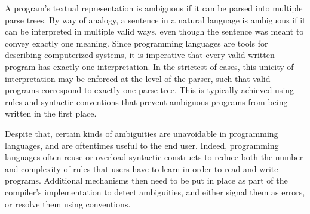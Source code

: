 
A program's textual representation is ambiguous if it can be parsed into multiple parse trees.
By way of analogy, a sentence in a natural language is ambiguous if it can be interpreted in multiple valid ways, even though the sentence was meant to convey exactly one meaning.
Since programming languages are tools for describing computerized systems, it is imperative that every valid written program has exactly one interpretation.
In the strictest of cases, this unicity of interpretation may be enforced at the level of the parser, such that valid programs correspond to exactly one parse tree.
This is typically achieved using rules and syntactic conventions that prevent ambiguous programs from being written in the first place.

Despite that, certain kinds of ambiguities are unavoidable in programming languages, and are oftentimes useful to the end user.
Indeed, programming languages often reuse or overload syntactic constructs to reduce both the number and complexity of rules that users have to learn in order to read and write programs.
Additional mechanisms then need to be put in place as part of the compiler's implementation to detect ambiguities, and either signal them as errors, or resolve them using conventions.


